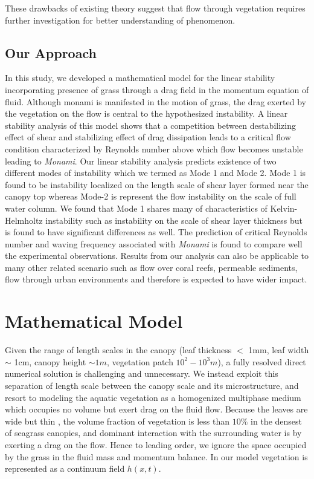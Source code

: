 \documentclass[12pt]{report}   %
\begin{document}
These drawbacks of existing theory suggest that flow through vegetation requires further investigation for better understanding of phenomenon.
\section{Our Approach}
In this study, we developed a mathematical model for the linear stability incorporating presence of grass through a drag field in the momentum equation of fluid. Although monami is manifested in the motion of grass, the drag exerted by the vegetation on the flow is central to the hypothesized instability. A linear stability analysis of this model shows that a competition between destabilizing effect of shear and stabilizing effect of drag dissipation leads to a critical flow condition characterized by Reynolds number above which flow becomes unstable leading to \textit{Monami}. Our linear stability analysis predicts existence of two different modes of instability which we termed as Mode 1 and Mode 2. Mode 1 is found to be instability localized on the length scale of shear layer formed near the canopy top whereas Mode-2 is represent the flow instability on the scale of full water column. We found that Mode 1 shares many of characteristics of Kelvin-Helmholtz instability such as instability on the scale of 
shear layer thickness but is found to have significant differences as well. The prediction of critical Reynolds number and waving frequency associated with \textit{Monami} is found to compare well the experimental observations. Results from our analysis can also be applicable to many other related scenario such as flow over coral reefs, permeable sediments, flow through urban environments and therefore is expected to have wider impact. 

%
\clearpage{\pagestyle{empty}\cleardoublepage}

\chapter{Mathematical Model}
Given the range of length scales in the canopy (leaf thickness $<$ 1mm, leaf width $\sim$ 1cm, canopy height $\sim 1m$, vegetation patch $10^2-10^3 m$), a fully resolved direct numerical solution is challenging and unnecessary. We instead exploit this separation of length scale between the canopy scale and its microstructure, and resort to modeling the aquatic vegetation as a homogenized multiphase medium which occupies no volume but exert drag on the fluid flow.
Because the leaves are wide but thin , the volume fraction of vegetation is less than $10\%$ \cite{chandler96} in the densest of seagrass canopies, and dominant interaction with the surrounding water is by exerting a drag on the flow. Hence to leading order, we ignore the space occupied by the grass in the fluid mass and momentum balance. In our model vegetation is represented as a continuum field $h(x,t)$. 
\end{document}
